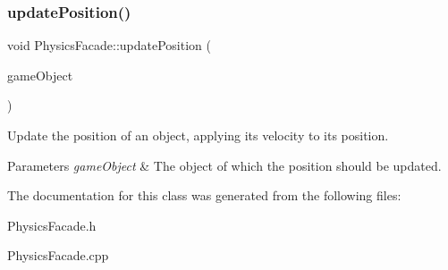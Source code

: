 \subsubsection{\texorpdfstring{update\+Position()}{updatePosition()}}
{\footnotesize\ttfamily void Physics\+Facade\+::update\+Position (\begin{DoxyParamCaption}\item[{shared\+\_\+ptr$<$ \mbox{\hyperlink{class_game_object}{Game\+Object}} $>$}]{game\+Object }\end{DoxyParamCaption})}



Update the position of an object, applying it\textquotesingle{}s velocity to it\textquotesingle{}s position. 


\begin{DoxyParams}{Parameters}
{\em game\+Object} & The object of which the position should be updated.\\
\hline
\end{DoxyParams}


The documentation for this class was generated from the following files\+:\begin{DoxyCompactItemize}
\item 
Physics\+Facade.\+h\item 
Physics\+Facade.\+cpp\end{DoxyCompactItemize}
